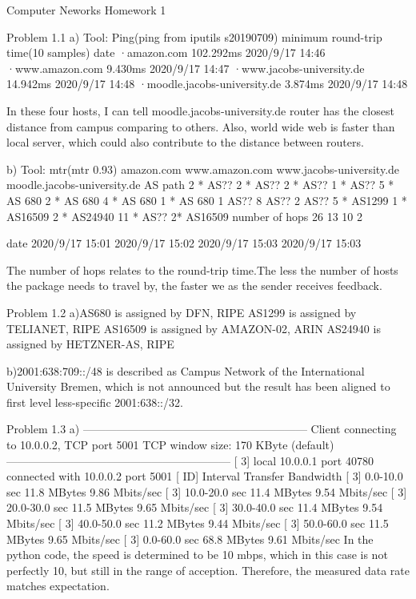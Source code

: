 																								Computer Neworks
																									Homework 1

Problem 1.1		 
		a) Tool: Ping(ping from iputils s20190709)
		  									              minimum round-trip time(10 samples)    date
      ·amazon.com 			              102.292ms 															2020/9/17 14:46
      ·www.amazon.com               	9.430ms 															  2020/9/17 14:47
      ·www.jacobs-university.de     14.942ms 															  2020/9/17 14:48
      ·moodle.jacobs-university.de  3.874ms 														   	2020/9/17 14:48

			In these four hosts, I can tell moodle.jacobs-university.de router has the closest distance from campus comparing to others. Also, world wide web is faster than local server, which could also contribute to the distance between routers.

		b) Tool: mtr(mtr 0.93)
						amazon.com  		www.amazon.com			www.jacobs-university.de  moodle.jacobs-university.de
	AS path   2 * AS??      2 * AS??            2 * AS??                   1 * AS?? 
           5 * AS 680     2 * AS 680         4 * AS 680                 1 * AS 680
          		1 AS??        8 AS??              2 AS??
						5 * AS1299      1 * AS16509       2 * AS24940
						11 * AS??
 						2* AS16509
	number
	of hops			26              13                10                            2
		
		date  2020/9/17 15:01 2020/9/17 15:02  2020/9/17 15:03               2020/9/17 15:03

		The number of hops relates to the round-trip time.The less the number of hosts the package needs to travel by, the faster we as the sender receives feedback.

Problem 1.2
		a)AS680 is assigned by DFN, RIPE 
			AS1299 is assigned by  TELIANET, RIPE
			AS16509 is assigned by AMAZON-02, ARIN 
			AS24940 is assigned by HETZNER-AS, RIPE 
		
		b)2001:638:709::/48 is described as Campus Network of the International University Bremen, which is not announced but the result has been aligned to first level less-specific 2001:638::/32.

Problem 1.3 
		a)
------------------------------------------------------------
			Client connecting to 10.0.0.2, TCP port 5001
			TCP window size:  170 KByte (default)
------------------------------------------------------------
			[  3] local 10.0.0.1 port 40780 connected with 10.0.0.2 port 5001
			[ ID] Interval       Transfer     Bandwidth
			[  3]  0.0-10.0 sec  11.8 MBytes  9.86 Mbits/sec
			[  3] 10.0-20.0 sec  11.4 MBytes  9.54 Mbits/sec
			[  3] 20.0-30.0 sec  11.5 MBytes  9.65 Mbits/sec
			[  3] 30.0-40.0 sec  11.4 MBytes  9.54 Mbits/sec
			[  3] 40.0-50.0 sec  11.2 MBytes  9.44 Mbits/sec
			[  3] 50.0-60.0 sec  11.5 MBytes  9.65 Mbits/sec
			[  3]  0.0-60.0 sec  68.8 MBytes  9.61 Mbits/sec
			In the python code, the speed is determined to be 10 mbps, which in this case is not perfectly 10, but still in the range of acception. Therefore, the measured data rate matches expectation.

